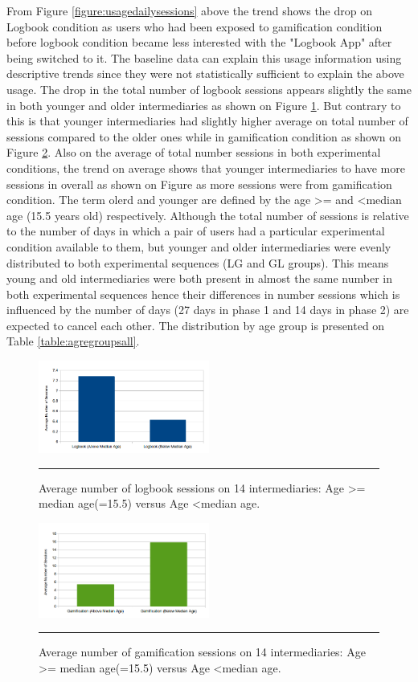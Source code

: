 From Figure \ref{figure:usagedailysessions} above the trend shows the drop on Logbook condition as users who had been exposed to gamification condition before logbook condition became less interested with the "Logbook App" after being switched to it. The baseline data  can explain this usage information using descriptive trends since they were not statistically sufficient to explain the above usage. The drop in the total number of logbook sessions appears slightly the same in both younger and older intermediaries as shown on Figure \ref{figure:logbookbyage}.  But contrary to this is that younger intermediaries had slightly higher average on total number of sessions compared to the older ones while in gamification condition  as shown on Figure \ref{figure:gambyage}. Also on the average of total number sessions in both experimental conditions, the trend on average shows that younger intermediaries to have more sessions in overall as shown on Figure as more sessions were from gamification condition.  The term olerd and younger are defined by the age \textgreater= and \textless median age (15.5 years old) respectively.  Although the total number of sessions is relative to the number of days in which a pair of users had a particular experimental condition available to them, but younger and older intermediaries were evenly distributed to both experimental sequences (LG and GL groups). This means young and old intermediaries were both present in almost the same number in both experimental sequences hence their differences in number sessions which  is influenced by the number of days (27 days in phase 1 and 14 days in phase 2) are expected to cancel each other. The distribution by age group is presented on Table \ref{table:agregroupsall}.
\begin{figure}[htbp]
  \centering
    \includegraphics[width=0.5\textwidth]{Figures/logbookbyage.png}
    \rule{35em}{0.5pt}
  \caption{Average number of logbook sessions on  14 intermediaries: Age \textgreater= median age(=15.5) versus Age \textless median age.}
  \label{figure:logbookbyage}
\end{figure}

\begin{figure}[htbp]
  \centering
    \includegraphics[width=0.5\textwidth]{Figures/gambyage.png}
    \rule{35em}{0.5pt}
  \caption{Average number of gamification sessions on  14 intermediaries: Age \textgreater= median age(=15.5) versus Age \textless median age.}
  \label{figure:gambyage}
\end{figure}

